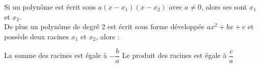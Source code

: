 \begin{Propriete}
    Si un polynôme est écrit sous  $a(x-x_1)(x-x_2)$ avec $a \neq 0$, alors ses  sont $x_1$ et $x_2$.\\

    De plus un polynôme de degré 2 est écrit sous forme développée $ax^2+bx+c$ et possède deux racines $x_1$ et $x_2$, alors :
    \begin{tcbenumerate}[2]
        \tcbitem La somme des racines est égale à $-\dfrac{b}{a}$
        \tcbitem Le produit des racines est égale à $\dfrac{c}{a}$
    \end{tcbenumerate}
\end{Propriete}